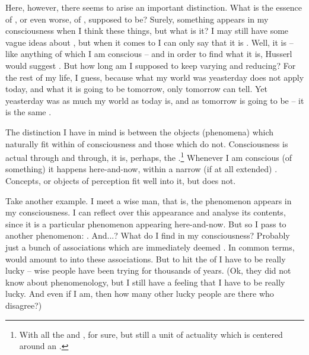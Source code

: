 Here, however, there seems to arise an important distinction. What is 
the essence of , or even worse, of 
, supposed to be? Surely, something appears in my 
consciousness when I think these things, but what is it? I may still 
have some vague ideas about , but when it 
comes to  I can only say that it is . Well, it is  -- like 
anything of which I am conscious -- and in order to find what it is, 
Husserl would suggest . But how long am I supposed 
to keep varying and reducing? For the rest of my life, I guess, 
because what my world was yeasterday does not apply today, and what 
it is going to be tomorrow, only tomorrow can tell. Yet  
yeasterday was as much my world as  today is, and as 
 tomorrow is going to be -- it is the same .

The distinction I have in mind is between the objects (phenomena) 
which naturally fit within  
of consciousness and those which do not. Consciousness is actual 
through and through, it is, perhaps, the .\footnote{With all the  and , for 
sure, but still a unit of actuality which is centered around an
.}
Whenever I am conscious (of something) it happens here-and-now, 
within a narrow (if at all extended) . 
Concepts, or objects of perception fit well into it, but  does not.

Take another example. I meet a wise man, that is, the phenomenon 
 appears in my consciousness. I can reflect over 
this appearance and analyse its contents, since it is a particular 
phenomenon appearing here-and-now. But so I pass to another phenomenon: 
. And...? What do I find in my consciousness? Probably 
just a bunch of associations which are immediately deemed 
. %
In common terms,  would 
amount to  into these 
associations. But to hit the  of  I have to be 
really lucky -- wise people have been trying for thousands of years. 
(Ok, they did not know about phenomenology, but I still have a 
feeling that I have to be really lucky. And even if I am, then how 
many other lucky people are there who disagree?)
%
%

